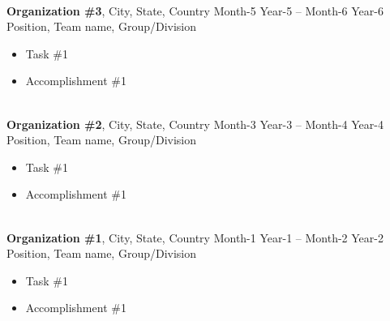\documentclass[letterpaper,10pt]{article}
\begin{document}
\hspace{-1.5cm}{\bf RELEVANT WORK EXPERIENCE}\\
{\bf Organization \#3}, City, State, Country \hfill Month-5 Year-5 -- Month-6 Year-6 \vspace{-0.05cm}\\
Position, Team name, Group/Division \\ \vspace{-0.604cm}
	\begin{itemize} \itemsep -3.7pt
	\item Task \#1
	\item Accomplishment \#1
	\end{itemize}
\vspace{-0.5cm}
\hspace{0cm}\\
{\bf Organization \#2}, City, State, Country \hfill Month-3 Year-3 -- Month-4 Year-4 \vspace{-0.05cm}\\
Position, Team name, Group/Division \\ \vspace{-0.604cm}
	\begin{itemize} \itemsep -3.7pt
	\item Task \#1
	\item Accomplishment \#1
	\end{itemize}
\vspace{-0.5cm}
\hspace{0cm}\\
{\bf Organization \#1}, City, State, Country \hfill Month-1 Year-1 -- Month-2 Year-2 \vspace{-0.05cm}\\
Position, Team name, Group/Division \\ \vspace{-0.604cm}
	\begin{itemize} \itemsep -3.7pt
	\item Task \#1
	\item Accomplishment \#1
	\end{itemize}

\vspace{-0.9cm}\hspace{0cm}\\
\end{document}
